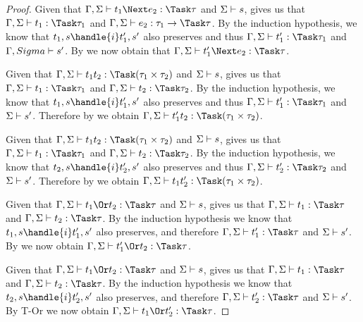 \begin{proof}
     {Given that $\Gamma,\Sigma\infers t_1\Next e_2:\Task\tau$ and $\Sigma\vdash s$,  gives us that $\Gamma,\Sigma\infers t_1:\Task\tau_1$ and $\Gamma,\Sigma\infers e_2:\tau_1\to\Task\tau$.
     By the induction hypothesis, we know that $t_1,s\handle{i}t_1',s'$ also preserves and thus $\Gamma,\Sigma\infers t_1':\Task\tau_1$ and $\Gamma,Sigma\vdash s'$.
     By  we now obtain that $\Gamma,\Sigma\infers t_1'\Next e_2:\Task\tau$. }

     {Given that $\Gamma,\Sigma\infers t_1\And t_2:\Task(\tau_1\times\tau_2)$ and $\Sigma\vdash s$,  gives us that $\Gamma,\Sigma\infers t_1:\Task\tau_1$ and $\Gamma,\Sigma\infers t_2:\Task\tau_2$.
     By the induction hypothesis, we know that $t_1,s\handle{i}t_1',s'$ also preserves and thus $\Gamma,\Sigma\infers t_1':\Task\tau_1$ and $\Sigma\vdash s'$.
     Therefore by  we obtain $\Gamma,\Sigma\infers t_1'\And t_2:\Task(\tau_1\times\tau_2)$.}

     {Given that $\Gamma,\Sigma\infers t_1\And t_2:\Task(\tau_1\times\tau_2)$ and $\Sigma\vdash s$,  gives us that $\Gamma,\Sigma\infers t_1:\Task\tau_1$ and $\Gamma,\Sigma\infers t_2:\Task\tau_2$.
     By the induction hypothesis, we know that $t_2,s\handle{i}t_2',s'$ also preserves and thus $\Gamma,\Sigma\infers t_2':\Task\tau_2$ and $\Sigma\vdash s'$.
     Therefore by  we obtain $\Gamma,\Sigma\infers t_1\And t_2':\Task(\tau_1\times\tau_2)$.}

     {Given that $\Gamma,\Sigma\infers t_1\Or t_2:\Task\tau$ and $\Sigma\vdash s$,  gives us that $\Gamma,\Sigma\infers t_1:\Task\tau$ and $\Gamma,\Sigma\infers t_2:\Task\tau$.
     By the induction hypothesis we know that $t_1,s\handle{i}t_1',s'$ also preserves, and therefore $\Gamma,\Sigma\infers t_1':\Task\tau$ and $\Sigma\vdash s'$.
     By  we now obtain $\Gamma,\Sigma\infers t_1'\Or t_2:\Task\tau$.}

     {Given that $\Gamma,\Sigma\infers t_1\Or t_2:\Task\tau$ and $\Sigma\vdash s$,  gives us that $\Gamma,\Sigma\infers t_1:\Task\tau$ and $\Gamma,\Sigma\infers t_2:\Task\tau$.
     By the induction hypothesis we know that $t_2,s\handle{i}t_2',s'$ also preserves, and therefore $\Gamma,\Sigma\infers t_2':\Task\tau$ and $\Sigma\vdash s'$.
     By T-Or we now obtain $\Gamma,\Sigma\infers t_1\Or t_2':\Task\tau$.}

\end{proof}

